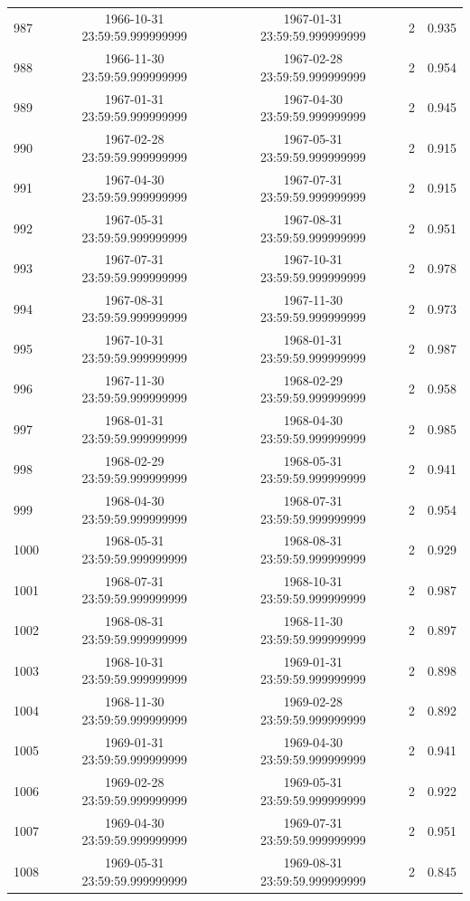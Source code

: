 \begin{table}
\begin{tabular}{lcccc}
987 & 1966-10-31 23:59:59.999999999 & 1967-01-31 23:59:59.999999999 & 2 & 0.935 \\
988 & 1966-11-30 23:59:59.999999999 & 1967-02-28 23:59:59.999999999 & 2 & 0.954 \\
989 & 1967-01-31 23:59:59.999999999 & 1967-04-30 23:59:59.999999999 & 2 & 0.945 \\
990 & 1967-02-28 23:59:59.999999999 & 1967-05-31 23:59:59.999999999 & 2 & 0.915 \\
991 & 1967-04-30 23:59:59.999999999 & 1967-07-31 23:59:59.999999999 & 2 & 0.915 \\
992 & 1967-05-31 23:59:59.999999999 & 1967-08-31 23:59:59.999999999 & 2 & 0.951 \\
993 & 1967-07-31 23:59:59.999999999 & 1967-10-31 23:59:59.999999999 & 2 & 0.978 \\
994 & 1967-08-31 23:59:59.999999999 & 1967-11-30 23:59:59.999999999 & 2 & 0.973 \\
995 & 1967-10-31 23:59:59.999999999 & 1968-01-31 23:59:59.999999999 & 2 & 0.987 \\
996 & 1967-11-30 23:59:59.999999999 & 1968-02-29 23:59:59.999999999 & 2 & 0.958 \\
997 & 1968-01-31 23:59:59.999999999 & 1968-04-30 23:59:59.999999999 & 2 & 0.985 \\
998 & 1968-02-29 23:59:59.999999999 & 1968-05-31 23:59:59.999999999 & 2 & 0.941 \\
999 & 1968-04-30 23:59:59.999999999 & 1968-07-31 23:59:59.999999999 & 2 & 0.954 \\
1000 & 1968-05-31 23:59:59.999999999 & 1968-08-31 23:59:59.999999999 & 2 & 0.929 \\
1001 & 1968-07-31 23:59:59.999999999 & 1968-10-31 23:59:59.999999999 & 2 & 0.987 \\
1002 & 1968-08-31 23:59:59.999999999 & 1968-11-30 23:59:59.999999999 & 2 & 0.897 \\
1003 & 1968-10-31 23:59:59.999999999 & 1969-01-31 23:59:59.999999999 & 2 & 0.898 \\
1004 & 1968-11-30 23:59:59.999999999 & 1969-02-28 23:59:59.999999999 & 2 & 0.892 \\
1005 & 1969-01-31 23:59:59.999999999 & 1969-04-30 23:59:59.999999999 & 2 & 0.941 \\
1006 & 1969-02-28 23:59:59.999999999 & 1969-05-31 23:59:59.999999999 & 2 & 0.922 \\
1007 & 1969-04-30 23:59:59.999999999 & 1969-07-31 23:59:59.999999999 & 2 & 0.951 \\
1008 & 1969-05-31 23:59:59.999999999 & 1969-08-31 23:59:59.999999999 & 2 & 0.845 \\

\end{tabular}
\end{table}
